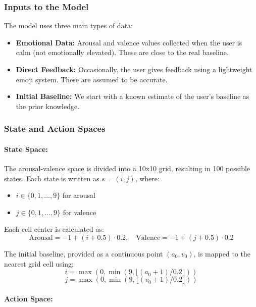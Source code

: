 \subsubsection*{Inputs to the Model}

The model uses three main types of data:

\begin{itemize}
    \item \textbf{Emotional Data:} Arousal and valence values collected when the user is calm (not emotionally elevated). These are close to the real baseline.
    \item \textbf{Direct Feedback:} Occasionally, the user gives feedback using a lightweight emoji system. These are assumed to be accurate.
    \item \textbf{Initial Baseline:} We start with a known estimate of the user's baseline as the prior knowledge.
\end{itemize}

\subsubsection*{State and Action Spaces}

\paragraph*{State Space:}
The arousal-valence space is divided into a 10x10 grid, resulting in 100 possible states. Each state is written as $s = (i, j)$, where:

\begin{itemize}
    \item $i \in \{0, 1, \ldots, 9\}$ for arousal
    \item $j \in \{0, 1, \ldots, 9\}$ for valence
\end{itemize}

Each cell center is calculated as:
\[
\text{Arousal} = -1 + (i + 0.5) \cdot 0.2, \quad \text{Valence} = -1 + (j + 0.5) \cdot 0.2
\]

The initial baseline, provided as a continuous point $(a_0, v_0)$, is mapped to the nearest grid cell using:
\[
i = \max(0, \min(9, \lfloor (a_0 + 1) / 0.2 \rfloor))
\]
\[
j = \max(0, \min(9, \lfloor (v_0 + 1) / 0.2 \rfloor))
\]

\paragraph*{Action Space:}

